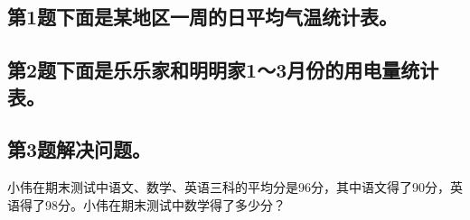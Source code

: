 \subsection*{第1题\quad 下面是某地区一周的日平均气温统计表。}
\subsection*{第2题\quad 下面是乐乐家和明明家1～3月份的用电量统计表。}
\subsection*{第3题\quad 解决问题。}
\noindent 小伟在期末测试中语文、数学、英语三科的平均分是96分，其中语文得了90分，英语得了98分。小伟在期末测试中数学得了多少分？\par
{}
